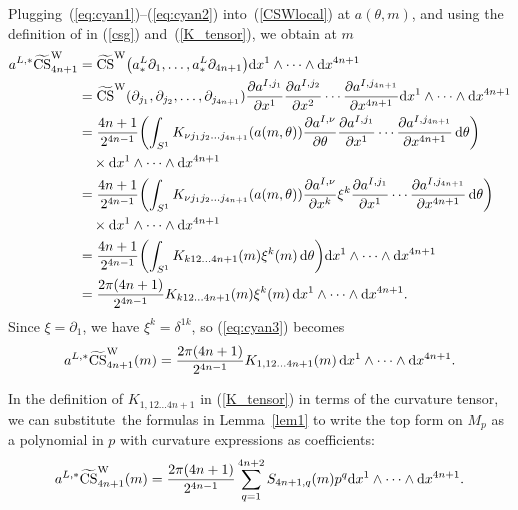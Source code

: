 \documentclass[pdftex]{sigma}
\numberwithin{equation}{section}
\theoremstyle{definition}
\newcommand{\ocs}{\widetilde{{\rm CS}}}
\newcommand{\omp}{M_p}
\begin{document}
Plugging~(\ref{eq:cyan1})--(\ref{eq:cyan2}) into~(\ref{CSWlocal}) at $a(\theta,m)$,
and using the definition of \smash{$\ocs^{\rm W}$} in (\ref{csg}) and~(\ref{K_tensor}), we obtain at $m$
\begin{align}
a^{L,*}\ocs^{\rm W}_{4n+1}
&= \ocs^{\rm W}\bigl(a^L_*\partial_1, \dots, a^L_*\partial_{4n+1}\bigr) {\rm d}x^1\wedge\cdots \wedge {\rm d}x^{4n+1}\nonumber\\
&= \ocs^{\rm W} (\partial_{j_1},\partial_{j_2},\dots,\partial_{j_{4n+1}} )
 \frac{\partial a^{I,j_1}}{\partial x^1} \frac{\partial a^{I,j_2}}{\partial x^2}\cdots
 \frac{\partial a^{I,j_{4n+1}}}{\partial x^{4n+1}}{\rm d}x^1\wedge\cdots \wedge {\rm d}x^{4n+1}\nonumber\\
 &= \frac{4n+1}{2^{4n-1}}\biggl(\int_{S^1} K_{\nu j_1 j_2 \dots j_{4n+1}}(a(m,\theta))
 \frac{\partial a^{I,\nu}}{\partial \theta}
 \frac{\partial a^{I,j_1}}{\partial x^1}\cdots
 \frac{\partial a^{I,j_{4n+1}}}{\partial x^{4n+1}}\, {\rm d}\theta\biggr)\nonumber\\
 &\quad \times {\rm d}x^1\wedge\cdots \wedge {\rm d}x^{4n+1}\nonumber\\
 &= \frac{4n+1}{2^{4n-1}}\biggl(\int_{S^1} K_{\nu j_1 j_2 \dots j_{4n+1}}(a(m,\theta))
 \frac{\partial a^{I,\nu}}{\partial x^k}\xi^k
 \frac{\partial a^{I,j_1}}{\partial x^1}\cdots
 \frac{\partial a^{I,j_{4n+1}}}{\partial x^{4n+1}}\, {\rm d}\theta\biggr)\nonumber\\
 &\quad \times {\rm d}x^1\wedge\cdots \wedge {\rm d}x^{4n+1}\nonumber\\
 &= \frac{4n+1}{2^{4n-1}}\biggl(\int_{S^1} K_{k 1 2\dots 4n+1}(m)\xi^k(m) \, {\rm d}\theta\biggr){\rm d}x^1\wedge\cdots \wedge {\rm d}x^{4n+1}\nonumber\\
 &= \frac{2\pi(4n+1)}{2^{4n-1}} K_{k 1 2\dots 4n+1}(m) \xi^k(m)\, {\rm d}x^1\wedge\cdots \wedge {\rm d}x^{4n+1}.\label{eq:cyan3}
\end{align}
Since $\xi = \partial_1$, we have $\xi^k = \delta^{1k}$, so (\ref{eq:cyan3}) becomes
\begin{equation}\label{eq:cyan4}
a^{L,*}\ocs^{\rm W}_{4n+1}(m) = \frac{2\pi(4n+1)}{2^{4n-1}} K_{1, 1 2\dots 4n+1}(m)\, {\rm d}x^1\wedge\cdots \wedge {\rm d}x^{4n+1}.
\end{equation}

In the definition of $K_{1,12\dots 4n+1}$ in (\ref{K_tensor}) in terms of the curvature tensor, we can substitute~the formulas in Lemma~\ref{lem1} to write the top form
\smash{$a^{L,*}\ocs{}^{\rm W}_{4n+1}$} on $\omp$ as a polynomial in $p$ with curvature expressions as coefficients:
\begin{equation}\label{eq:11aa}
a^{L,*}\ocs^{\rm W}_{4n+1}(m) = \frac{2\pi(4n+1)}{2^{4n-1}}\sum_{q = 1}^{4n+2} S_{4n+1,q}(m) p^q {\rm d}x^1\wedge\dots\wedge {\rm d}x^{4n+1}.
\end{equation}
\end{document}

